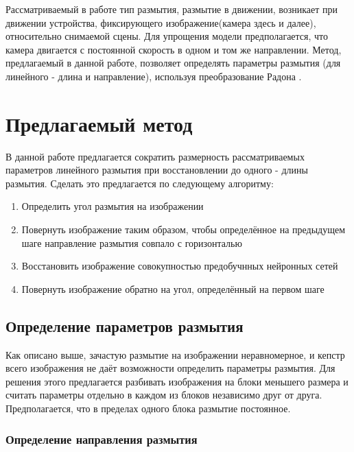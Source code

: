 Рассматриваемый в работе тип размытия, размытие в движении, возникает при движении устройства, фиксирующего изображение(камера здесь и далее), относительно снимаемой сцены. 
Для упрощения модели предполагается, что камера двигается с постоянной скорость в одном и том же направлении. Метод, предлагаемый в данной работе, позволяет определять параметры размытия (для линейного - длина и направление), используя преобразование Радона \cite{oliv}.


\newpage
\section{Предлагаемый метод}

В данной работе предлагается сократить размерность рассматриваемых параметров линейного размытия при восстановлении до одного - длины размытия. Сделать это предлагается по следующему алгоритму:
\begin{enumerate} 
    \item Определить угол размытия на изображении
    \item Повернуть изображение таким образом, чтобы определённое на предыдущем шаге направление размытия совпало с горизонталью
    \item Восстановить изображение совокупностью предобучнных нейронных сетей 
    \item Повернуть изображение обратно на угол, определённый на первом шаге
\end{enumerate}


\subsection{Определение параметров размытия}

Как описано выше, зачастую размытие на изображении неравномерное, и кепстр всего изображения не даёт возможности определить параметры размытия. Для решения этого предлагается разбивать изображения на блоки меньшего размера и считать параметры отдельно в каждом из блоков независимо друг от друга.
Предполагается, что в пределах одного блока размытие постоянное.

\subsubsection{Определение направления размытия}

